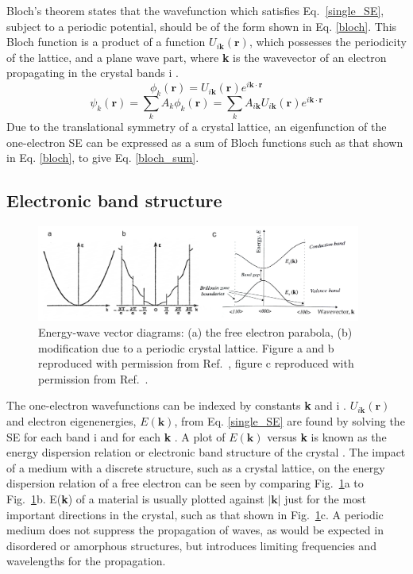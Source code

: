 \documentclass[11pt, twoside]{report}
\begin{document}
Bloch's theorem states that the wavefunction which satisfies Eq.~\ref{single_SE}, subject to a periodic potential, should be of the form shown in Eq. \ref{bloch}. This Bloch function is a product of a function $U_{i\mathbf{k}}(\mathbf{r})$, which possesses the periodicity of the lattice, and a plane wave part, where \textbf{k} is the wavevector of an electron propagating in the crystal bands i \cite{Nelson3}.
\begin{equation} \label{bloch}
\phi_k(\mathbf{r}) = U_{i\mathbf{k}}(\mathbf{r}) e^{i\mathbf{k \cdot r}} 
\end{equation}
\begin{equation} \label{bloch_sum}
\psi_k(\mathbf{r}) = \sum_k A_k \phi_k(\mathbf{r}) = \sum_k A_{i\mathbf{k}}U_{i\mathbf{k}}(\mathbf{r}) e^{i\mathbf{k \cdot r}} 
\end{equation}
Due to the translational symmetry of a crystal lattice, an eigenfunction of the one-electron SE can be expressed as a sum of Bloch functions such as that shown in Eq. \ref{bloch}, to give Eq. \ref{bloch_sum}. 


\subsection{Electronic band structure}

\begin{figure}[h!]
  \centering
    \includegraphics[width=0.95\textwidth]{figures/bs1_2.png}
    \caption[Energy-wave vector diagrams: (a) the free electron parabola, (b) modification due to a periodic crystal lattice.]{Energy-wave vector diagrams: (a) the free electron parabola, (b) modification due to a periodic crystal lattice. Figure a and b reproduced with permission from Ref.~, figure c reproduced with permission from Ref.~.}
  \label{bs1}
\end{figure}
The one-electron wavefunctions can be indexed by constants \textbf{k} and i \cite{fund_semi}. 
$U_{i\mathbf{k}}(\mathbf{r})$ and electron eigenenergies, $E(\mathbf{k})$, from Eq. \ref{single_SE} are found by solving the SE for each band i and for each \textbf{k} \cite{Nelson3}.
A plot of $E(\textbf{k})$ versus \textbf{k} is known as the energy dispersion relation or electronic band structure of the crystal \cite{fund_semi}.
The impact of a medium with a discrete structure, such as a crystal lattice, on the energy dispersion relation of a free electron can be seen by comparing Fig.~\ref{bs1}a to Fig.~\ref{bs1}b.
E(\textbf{k}) of a material is usually plotted against $|\textbf{k}|$ just for the most important directions in the crystal, such as that shown in Fig.~\ref{bs1}c. A periodic medium does not suppress the propagation of waves, as would be expected in disordered or amorphous structures, but introduces limiting frequencies and wavelengths for the propagation. 
\end{document}
